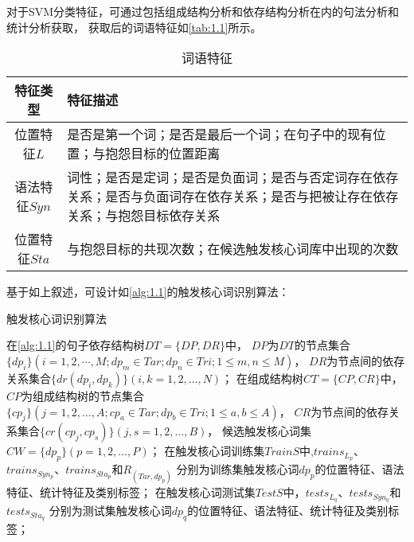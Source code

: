 对于SVM分类特征，可通过包括组成结构分析和依存结构分析在内的句法分析和统计分析获取，
获取后的词语特征如\autoref{tab:1.1}所示。
\begin{table}[ht]
\centering
\caption{词语特征}\label{tab:1.1}
\vskip -10pt
\begin{tabularx}{\textwidth}{cX}
\toprule
特征类型 & 特征描述 \\
\midrule
位置特征$L$ & 是否是第一个词；是否是最后一个词；在句子中的现有位置；与抱怨目标的位置距离 \\
语法特征$Syn$ & 词性；是否是定词；是否是负面词；是否与否定词存在依存关系；是否与负面词存在依存关系；是否与把被让存在依存关系；与抱怨目标依存关系 \\
位置特征$Sta$ & 与抱怨目标的共现次数；在候选触发核心词库中出现的次数 \\
\bottomrule
\end{tabularx}
\end{table}

基于如上叙述，可设计如\autoref{alg:1.1}的触发核心词识别算法：

\begin{algorithm}[htb]
\caption{触发核心词识别算法}\label{alg:1.1}

\SetAlgoLined
{}

\end{algorithm}

在\autoref{alg:1.1}的句子依存结构树$DT=\{ DP,DR \}$中，
$DP$为$DT$的节点集合$\{ dp_i \}(i=1,2,⋯,M;dp_m \in Tar;dp_n \in Tri;1 \le m,n \le M)$，
$DR$为节点间的依存关系集合$\{ dr (dp_i,dp_k) \}(i,k=1,2,\ldots,N)$；
在组成结构树$CT=\{CP,CR\}$中，$CP$为组成结构树的节点集合$\{cp_j\}(j=1,2,\ldots,A;cp_a \in Tar;dp_b \in Tri;1 \le a,b \le A)$，
$CR$为节点间的依存关系集合$\{cr (cp_j,cp_s)\}(j,s=1,2,\ldots,B)$，
候选触发核心词集$CW=\{dp_p \}(p=1,2,\ldots,P)$；
在触发核心词训练集$TrainS$中,$trains_{L_p}$、$trains_{Syn_p}$、$trains_{Sta_p}$和$R_{(Tar,dp_p )}$
分别为训练集触发核心词$dp_p$的位置特征、语法特征、统计特征及类别标签；
在触发核心词测试集$TestS$中，$tests_{L_q}$、$tests_{Syn_q}$和$tests_{Sta_q}$
分别为测试集触发核心词$dp_q$的位置特征、语法特征、统计特征及类别标签；

